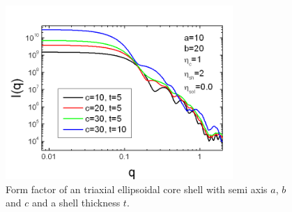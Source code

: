 \begin{figure}[htb]
\begin{center}
\includegraphics[width=0.768\textwidth,height=0.588\textwidth]{../images/form_factor/Ellipsoid/triax_ellipsoidal_core_shell.png}
\end{center}
\caption{Form factor of an triaxial ellipsoidal core shell with semi
axis $a$, $b$ and $c$ and a shell thickness $t$.}
\label{fig:I_ellipsoidal_core_shell}
\end{figure}
